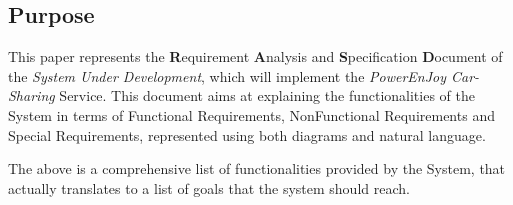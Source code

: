\subsection{Purpose}
This paper represents the \textbf{R}equirement \textbf{A}nalysis and \textbf{S}pecification \textbf{D}ocument of the \textit{System Under Development}, which will implement the \emph{PowerEnJoy Car-Sharing} Service. This document aims at explaining the functionalities of the System in terms of Functional Requirements, NonFunctional Requirements and Special Requirements, represented using both diagrams and natural language.


The above is a comprehensive list of functionalities provided by the System, that actually translates to a list of goals that the system should reach.

